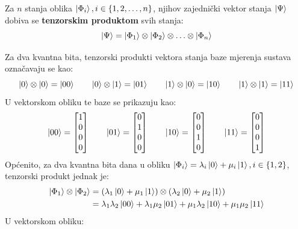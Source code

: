 Za $n$ stanja oblika $\ket{\Phi_i},i \in \{1, 2, \ldots, n\}$, njihov zajednički vektor stanja $\ket{\Psi}$ dobiva se \textbf{tenzorskim produktom} svih stanja:
\[
\ket{\Psi} = \ket{\Phi_1} \otimes \ket{\Phi_2} \otimes \ldots \otimes \ket{\Phi_n}
\]

Za dva kvantna bita, tenzorski produkti vektora stanja baze mjerenja sustava označavaju se kao:
\[
\ket{0} \otimes \ket{0} = \ket{00} \qquad  \ket{0} \otimes \ket{1} = \ket{01} \qquad \ket{1} \otimes \ket{0} = \ket{10} \qquad \ket{1} \otimes \ket{1} = \ket{11}
\]
U vektorskom obliku te baze se prikazuju kao:
\[
\ket{00} = \begin{bmatrix}
1 \\ 0 \\ 0 \\ 0
\end{bmatrix}
\qquad
\ket{01} = \begin{bmatrix}
0 \\ 1 \\ 0 \\ 0
\end{bmatrix}
\qquad
\ket{10} = \begin{bmatrix}
0 \\ 0 \\ 1 \\ 0
\end{bmatrix}
\qquad
\ket{11} = \begin{bmatrix}
0 \\ 0 \\ 0 \\ 1
\end{bmatrix}
\]
Općenito, za dva kvantna bita dana u obliku $\ket{\Phi_i} = \lambda_i\ket{0} + \mu_i\ket{1}, i \in \{1, 2\}$, tenzorski produkt jednak je:
\begin{align}
\begin{split}
\ket{\Phi_1} \otimes \ket{\Phi_2} &= (\lambda_1\ket{0} + \mu_1\ket{1}) \otimes (\lambda_2\ket{0} + \mu_2\ket{1})
\\
&= \lambda_1\lambda_2\ket{00} + \lambda_1\mu_2\ket{01} + \mu_1\lambda_2\ket{10} + \mu_1\mu_2\ket{11}
\label{eq:tensor2qubits}
\end{split}
\end{align}
U vektorskom obliku:
